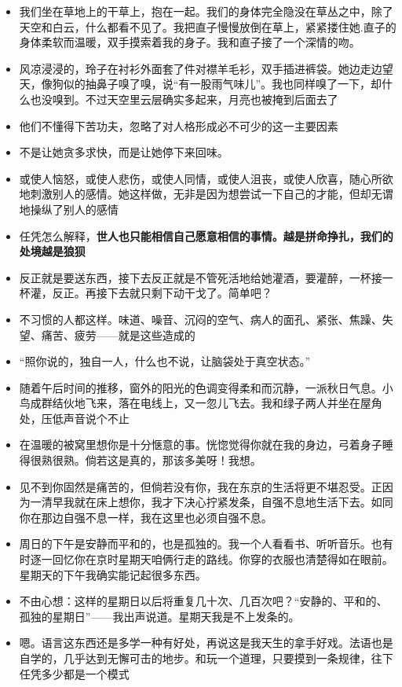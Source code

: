 \documentclass[UTF8,a4paper,8pt]{ctexart}
\begin{document}
\begin{itemize}
 	\item 我们坐在草地上的干草上，抱在一起。我们的身体完全隐没在草丛之中，除了天空和白云，什么都看不见了。我把直子慢慢放倒在草上，紧紧搂住她.直子的身体柔软而温暖，双手摸索着我的身子。我和直子接了一个深情的吻。
 	\item 风凉浸浸的，玲子在衬衫外面套了件对襟羊毛衫，双手插进裤袋。她边走边望天，像狗似的抽鼻子嗅了嗅，说“有一股雨气味儿”。我也同样嗅了一下，却什么也没嗅到。不过天空里云层确实多起来，月亮也被掩到后面去了
 	\item 他们不懂得下苦功夫，忽略了对人格形成必不可少的这一主要因素
 	\item 不是让她贪多求快，而是让她停下来回味。
 	\item 或使人恼怒，或使人悲伤，或使人同情，或使人沮丧，或使人欣喜，随心所欲地刺激别人的感情。她这样做，无非是因为想尝试一下自己的才能，但却无谓地操纵了别人的感情
 	\item 任凭怎么解释，\textbf{世人也只能相信自己愿意相信的事情。越是拼命挣扎，我们的处境越是狼狈}
 	\item 反正就是要送东西，接下去反正就是不管死活地给她灌酒，要灌醉，一杯接一杯灌，反正。再接下去就只剩下动干戈了。简单吧？
 	\item 不习惯的人都这样。味道、噪音、沉闷的空气、病人的面孔、紧张、焦躁、失望、痛苦、疲劳——就是这些造成的
 	\item “照你说的，独自一人，什么也不说，让脑袋处于真空状态。”
 	\item 随着午后时间的推移，窗外的阳光的色调变得柔和而沉静，一派秋日气息。小鸟成群结伙地飞来，落在电线上，又一忽儿飞去。我和绿子两人并坐在屋角处，压低声音说个不止
 	\item 在温暖的被窝里想你是十分惬意的事。恍惚觉得你就在我的身边，弓着身子睡得很熟很熟。倘若这是真的，那该多美呀！我想。
 	\item 见不到你固然是痛苦的，但倘若没有你，我在东京的生活将更不堪忍受。正因为一清早我就在床上想你，我才下决心拧紧发条，自强不息地生活下去。如同你在那边自强不息一样，我在这里也必须自强不息。
 	\item 周日的下午是安静而平和的，也是孤独的。我一个人看看书、听听音乐。也有时逐一回忆你在京时星期天咱俩行走的路线。你穿的衣服也清楚得如在眼前。星期天的下午我确实能记起很多东西。
 	\item 不由心想：这样的星期日以后将重复几十次、几百次吧？“安静的、平和的、孤独的星期日”——我出声说道。星期天我是不上发条的。
 	\item 嗯。语言这东西还是多学一种有好处，再说这是我天生的拿手好戏。法语也是自学的，几乎达到无懈可击的地步。和玩一个道理，只要摸到一条规律，往下任凭多少都是一个模式

\end{itemize}
\end{document}
